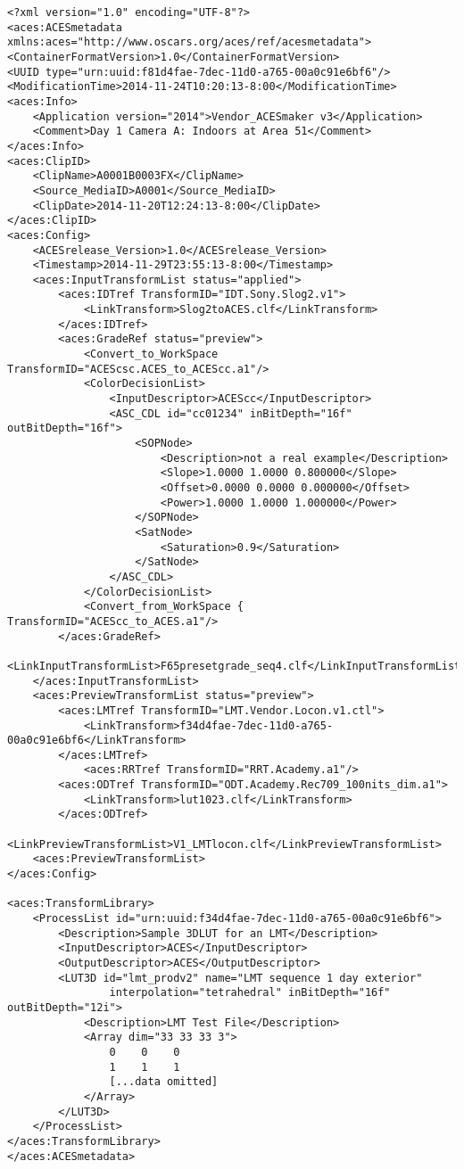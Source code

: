 \label{appendixA}

\begin{lstlisting}
<?xml version="1.0" encoding="UTF-8"?>
<aces:ACESmetadata xmlns:aces="http://www.oscars.org/aces/ref/acesmetadata">
<ContainerFormatVersion>1.0</ContainerFormatVersion>
<UUID type="urn:uuid:f81d4fae-7dec-11d0-a765-00a0c91e6bf6"/>
<ModificationTime>2014-11-24T10:20:13-8:00</ModificationTime>
<aces:Info>
    <Application version="2014">Vendor_ACESmaker v3</Application>
    <Comment>Day 1 Camera A: Indoors at Area 51</Comment>
</aces:Info>
<aces:ClipID>
    <ClipName>A0001B0003FX</ClipName>
    <Source_MediaID>A0001</Source_MediaID>
    <ClipDate>2014-11-20T12:24:13-8:00</ClipDate>
</aces:ClipID>
<aces:Config>
    <ACESrelease_Version>1.0</ACESrelease_Version>
    <Timestamp>2014-11-29T23:55:13-8:00</Timestamp>
    <aces:InputTransformList status="applied">
        <aces:IDTref TransformID="IDT.Sony.Slog2.v1">
            <LinkTransform>Slog2toACES.clf</LinkTransform>
        </aces:IDTref>
        <aces:GradeRef status="preview">
            <Convert_to_WorkSpace TransformID="ACEScsc.ACES_to_ACEScc.a1"/>
            <ColorDecisionList>
                <InputDescriptor>ACEScc</InputDescriptor>
                <ASC_CDL id="cc01234" inBitDepth="16f" outBitDepth="16f">
                    <SOPNode>
                        <Description>not a real example</Description>
                        <Slope>1.0000 1.0000 0.800000</Slope>
                        <Offset>0.0000 0.0000 0.000000</Offset>
                        <Power>1.0000 1.0000 1.000000</Power>
                    </SOPNode>
                    <SatNode>
                        <Saturation>0.9</Saturation>
                    </SatNode>
                </ASC_CDL>
            </ColorDecisionList>
            <Convert_from_WorkSpace { TransformID="ACEScc_to_ACES.a1"/>
        </aces:GradeRef>
        <LinkInputTransformList>F65presetgrade_seq4.clf</LinkInputTransformList>
    </aces:InputTransformList>
    <aces:PreviewTransformList status="preview">
        <aces:LMTref TransformID="LMT.Vendor.Locon.v1.ctl">
            <LinkTransform>f34d4fae-7dec-11d0-a765-00a0c91e6bf6</LinkTransform>
        </aces:LMTref>
            <aces:RRTref TransformID="RRT.Academy.a1"/>
        <aces:ODTref TransformID="ODT.Academy.Rec709_100nits_dim.a1">
            <LinkTransform>lut1023.clf</LinkTransform>
        </aces:ODTref>
        <LinkPreviewTransformList>V1_LMTlocon.clf</LinkPreviewTransformList>
    <aces:PreviewTransformList>
</aces:Config>

<aces:TransformLibrary>
    <ProcessList id="urn:uuid:f34d4fae-7dec-11d0-a765-00a0c91e6bf6">
        <Description>Sample 3DLUT for an LMT</Description>
        <InputDescriptor>ACES</InputDescriptor>
        <OutputDescriptor>ACES</OutputDescriptor>
        <LUT3D id="lmt_prodv2" name="LMT sequence 1 day exterior" 
                interpolation="tetrahedral" inBitDepth="16f" outBitDepth="12i">
            <Description>LMT Test File</Description>
            <Array dim="33 33 33 3">
                0    0    0
                1    1    1
                [...data omitted]
            </Array>
        </LUT3D>
    </ProcessList>
</aces:TransformLibrary>
</aces:ACESmetadata>
\end{lstlisting}
